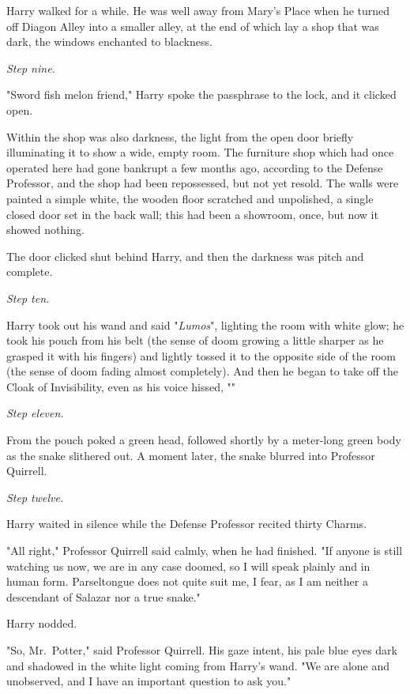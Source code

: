 Harry walked for a while. He was well away from Mary's Place when he turned off
Diagon Alley into a smaller alley, at the end of which lay a shop that was
dark, the windows enchanted to blackness.

\emph{Step nine.}

"Sword fish melon friend," Harry spoke the passphrase to the lock, and it
clicked open.

Within the shop was also darkness, the light from the open door briefly
illuminating it to show a wide, empty room. The furniture shop which had once
operated here had gone bankrupt a few months ago, according to the Defense
Professor, and the shop had been repossessed, but not yet resold. The walls
were painted a simple white, the wooden floor scratched and unpolished, a
single closed door set in the back wall; this had been a showroom, once, but
now it showed nothing.

The door clicked shut behind Harry, and then the darkness was pitch and
complete.

\emph{Step ten.}

Harry took out his wand and said "\emph{Lumos}", lighting the room with white
glow; he took his pouch from his belt (the sense of doom growing a little
sharper as he grasped it with his fingers) and lightly tossed it to the
opposite side of the room (the sense of doom fading almost completely). And
then he began to take off the Cloak of Invisibility, even as his voice hissed,
""

\emph{Step eleven.}

From the pouch poked a green head, followed shortly by a meter-long green body
as the snake slithered out. A moment later, the snake blurred into Professor
Quirrell.

\emph{Step twelve.}

Harry waited in silence while the Defense Professor recited thirty Charms.

"All right," Professor Quirrell said calmly, when he had finished. "If anyone
is still watching us now, we are in any case doomed, so I will speak plainly
and in human form. Parseltongue does not quite suit me, I fear, as I am neither
a descendant of Salazar nor a true snake."

Harry nodded.

"So, Mr.~Potter," said Professor Quirrell. His gaze intent, his pale blue eyes
dark and shadowed in the white light coming from Harry's wand. "We are alone
and unobserved, and I have an important question to ask you."

